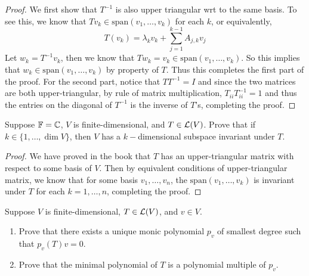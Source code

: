 \documentclass{extarticle}
\begin{document}
\begin{proof}
We first show that \(T^{-1}\) is also upper triangular wrt to the same basis. To see this, we know 
that \(T v_k \in \text{span}(v_1, \ldots, v_k)\) for each \(k\), or equivalently, 
\[T(v_k) = \lambda_k v_k + \sum_{j=1}^{k-1}A_{j,k}v_j\]
Let \(w_k = T^{-1}v_k\), then we know that \(T w_k = v_k \in \text{span}(v_1, \ldots, v_k)\). So this 
implies that \(w_k \in \text{span}(v_1, \ldots, v_k)\) by property of \(T\). Thus this completes the 
first part of the proof. For the second part, notice that \(TT^{-1} = I\) and since the two matrices 
are both upper-triangular, by rule of matrix multiplication, \(T_{ii} T^{-1}_{ii} = 1\) and thus 
the entries on the diagonal of \(T^{-1}\) is the inverse of \(T\)'s, completing the proof.  

\end{proof}

\begin{problem}{6}
    Suppose \(\mathbb{F} = \mathbb{C}\), \(V\) is finite-dimensional, and \(T \in \mathcal{L}(V)\). Prove that if 
    \(k \in \{1, \ldots, \dim V\}\), then \(V\) has a \(k-\)dimensional subspace 
    invariant under \(T\).
\end{problem}

\begin{proof}
We have proved in the book that \(T\) has an upper-triangular matrix with respect to some basis 
of \(V\). Then by equivalent conditions of upper-triangular matrix, we know that for some basis 
\(v_1, \ldots, v_n\), the \(\text{span}(v_1, \ldots, v_k)\) is invariant under \(T\) for each 
\(k = 1, \ldots, n\), completing the proof. 
\end{proof}


\begin{problem}{7}
    Suppose \(V\) is finite-dimensional, \(T \in \mathcal{L}(V)\), and \(v \in V\). 
    \begin{enumerate}[label=(\alph*)]
        \item Prove that there exists a unique monic polynomial \(p_v\) of smallest degree such that 
        \(p_v(T)v = 0\).
        \item Prove that the minimal polynomial of \(T\) is a polynomial multiple of \(p_v\).
    \end{enumerate}
\end{problem}
\end{document}
